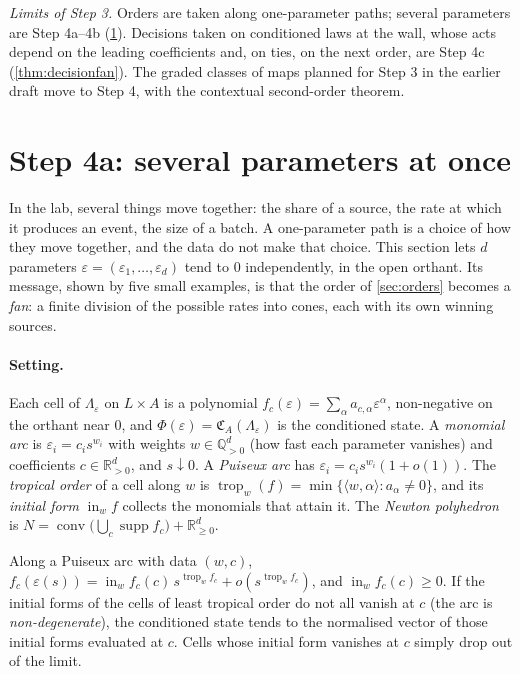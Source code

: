 \documentclass[11pt]{article}
\theoremstyle{definition}\newtheorem{definition}[theorem]{Definition}\newtheorem{remark}[theorem]{Remark}\newtheorem{example}[theorem]{Example}
\newcommand{\R}{\mathbb R}\newcommand{\D}{\mathcal D}
\begin{document}
\emph{Limits of Step 3.} Orders are taken along one-parameter paths; several parameters are Step 4a--4b (\cref{sec:fan}). Decisions taken on conditioned laws at the wall, whose acts depend on the leading
coefficients and, on ties, on the next order, are Step 4c (\cref{thm:decisionfan}). The graded classes of maps planned for Step 3 in the earlier draft move to Step 4, with the
contextual second-order theorem.

\section{Step 4a: several parameters at once}\label{sec:fan}
In the lab, several things move together: the share of a source, the rate at which it produces an event, the size of a batch. A
one-parameter path is a choice of how they move together, and the data do not make that choice. This section lets $d$ parameters
$\varepsilon=(\varepsilon_1,\dots,\varepsilon_d)$ tend to $0$ independently, in the open orthant. Its message, shown by five small examples, is that
the order of \cref{sec:orders} becomes a \emph{fan}: a finite division of the possible rates into cones, each with its own winning sources.

\paragraph{Setting.} Each cell of $\Lambda_\varepsilon$ on $L\times A$ is a polynomial $f_c(\varepsilon)=\sum_\alpha a_{c,\alpha}\varepsilon^\alpha$, non-negative on the orthant
near $0$, and $\Phi(\varepsilon)=\mathfrak C_A(\Lambda_\varepsilon)$ is the conditioned state. A \emph{monomial arc} is $\varepsilon_i=c_is^{w_i}$ with weights $w\in\mathbb Q^d_{>0}$
(how fast each parameter vanishes) and coefficients $c\in\R^d_{>0}$, and $s\downarrow0$. A \emph{Puiseux arc} has $\varepsilon_i=c_is^{w_i}(1+o(1))$.
The \emph{tropical order} of a cell along $w$ is $\operatorname{trop}_w(f)=\min\{\langle w,\alpha\rangle:a_\alpha\ne0\}$, and its \emph{initial form}
$\operatorname{in}_wf$ collects the monomials that attain it. The \emph{Newton polyhedron} is $N=\operatorname{conv}\bigl(\bigcup_c\operatorname{supp}f_c\bigr)+\R^d_{\ge0}$.

\begin{proposition}\label{prop:arc}
Along a Puiseux arc with data $(w,c)$, $f_c(\varepsilon(s))=\operatorname{in}_wf_c(c)\,s^{\operatorname{trop}_wf_c}+o(s^{\operatorname{trop}_wf_c})$, and $\operatorname{in}_wf_c(c)\ge0$. If the initial forms
of the cells of least tropical order do not all vanish at $c$ (the arc is \emph{non-degenerate}), the conditioned state tends to the
normalised vector of those initial forms evaluated at $c$. Cells whose initial form vanishes at $c$ simply drop out of the limit.
\end{proposition}
\end{document}
